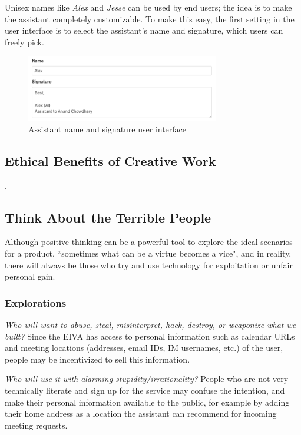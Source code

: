 \documentclass{article}
\begin{document}
Unisex names like \emph{Alex} and \emph{Jesse} can be used by end users; the idea is to make the assistant completely customizable. To make this easy, the first setting in the user interface is to select the assistant's name and signature, which users can freely pick.


\begin{figure}[h]
 \centering
 \includegraphics[width=0.75\textwidth]{name.png}
 \caption{Assistant name and signature user interface}
 \label{fig:checkbox}
\end{figure}

\subsection{Ethical Benefits of Creative Work}

.

\subsection{Think About the Terrible People}

Although positive thinking can be a powerful tool to explore the ideal scenarios for a product, ``sometimes what can be a virtue becomes a vice", and in reality, there will always be those who try and use technology for exploitation or unfair personal gain.

\subsubsection{Explorations}

\emph{Who will want to abuse, steal, misinterpret, hack, destroy, or weaponize what we built?} Since the EIVA has access to personal information such as calendar URLs and meeting locations (addresses, email IDs, IM usernames, etc.) of the user, people may be incentivized to sell this information.

\emph{Who will use it with alarming stupidity/irrationality?} People who are not very technically literate and sign up for the service may confuse the intention, and make their personal information available to the public, for example by adding their home address as a location the assistant can recommend for incoming meeting requests.
\end{document}
